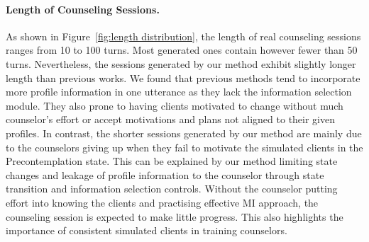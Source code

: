 \paragraph{Length of Counseling Sessions.} As shown in Figure~\ref{fig:length distribution}, the length of real counseling sessions ranges from 10 to 100 turns. Most generated ones contain however fewer than 50 turns. Nevertheless, the sessions generated by our method exhibit slightly longer length than previous works. We found that previous methods tend to incorporate more profile information in one utterance as they lack the information selection module. They also prone to having clients motivated to change without much counselor's effort or accept motivations and plans not aligned to their given profiles. In contrast, the shorter sessions generated by our method are mainly due to the counselors giving up when they fail to motivate the simulated clients in the Precontemplation state. This can be explained by our method limiting state changes and leakage of profile information to the counselor through state transition and information selection controls. Without the counselor putting effort into knowing the clients and practising effective MI approach, the counseling session is expected to make little progress. This also highlights the importance of consistent simulated clients in training counselors.




